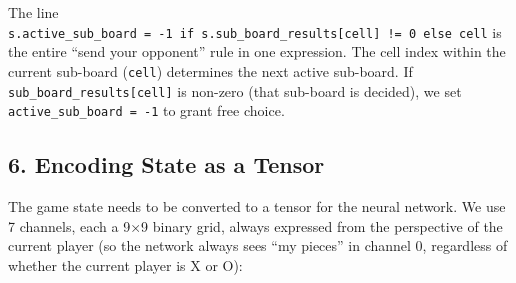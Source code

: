 The line
\texttt{s.active\_sub\_board\ =\ -1\ if\ s.sub\_board\_results{[}cell{]}\ !=\ 0\ else\ cell}
is the entire ``send your opponent'' rule in one expression. The cell
index within the current sub-board (\texttt{cell}) determines the next
active sub-board. If \texttt{sub\_board\_results{[}cell{]}} is non-zero
(that sub-board is decided), we set \texttt{active\_sub\_board\ =\ -1}
to grant free choice.

\hypertarget{encoding-state-as-a-tensor}{%
\subsection{6. Encoding State as a
Tensor}\label{encoding-state-as-a-tensor}}

The game state needs to be converted to a tensor for the neural network.
We use 7 channels, each a 9×9 binary grid, always expressed from the
perspective of the current player (so the network always sees ``my
pieces'' in channel 0, regardless of whether the current player is X or
O):

